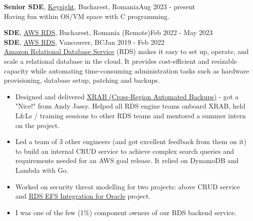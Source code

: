 \documentclass[line, margin]{resume}
\begin{document}
\begin{resume}
\textbf{Senior SDE}, \href{https://www.keysight.com/}{Keysight}, Bucharest, Romania\hfill Aug 2023 - present\\
Having fun within OS/VM space with C programming.

\textbf{SDE}, \href{https://aws.amazon.com/}{AWS RDS}, Bucharest, Romania (Remote)\hfill Feb 2022 - May 2023\\
\textbf{SDE}, \href{https://aws.amazon.com/}{AWS RDS}, Vancouver, BC\hfill Jan 2019 - Feb 2022 \\
\href{https://aws.amazon.com/rds/}{Amazon Relational Database Service} (RDS) makes it easy to set up, operate, and scale a relational database in the cloud. It provides cost-efficient and resizable capacity while automating time-consuming administration tasks such as hardware provisioning, database setup, patching and backups.
\begin{itemize} \itemsep -2pt  %
    \item Designed and delivered \href{https://docs.aws.amazon.com/AmazonRDS/latest/UserGuide/USER_ReplicateBackups.html}{XRAB (Cross-Region Automated Backups)} - got a "Nice!" from Andy Jassy. Helped all RDS engine teams onboard XRAB, held L\&Ls / training sessions to other RDS teams and mentored a summer intern on the project.
    \item Led a team of 3 other engineers (and got excellent feedback from them on it) to build an internal CRUD service to achieve complex search queries and requirements needed for an AWS goal release. It relied on DynamoDB and Lambda with Go.
    \item Worked on security threat modelling for two projects: above CRUD service and \href{https://docs.aws.amazon.com/AmazonRDS/latest/UserGuide/oracle-efs-integration.html}{RDS EFS Integration for Oracle} project.
    \item I was one of the few (1\%) component owners of our RDS backend service. %
\end{itemize}



\end{resume}
\end{document}

